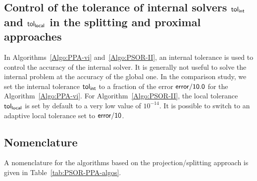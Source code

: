 \subsection{Control of the tolerance of internal solvers $\sf tol_{{int}}$ and $\sf tol_{{local}}$ in the splitting and proximal approaches}
\label{Sec:NSGS-LocalTol}
In Algorithms~\ref{Algo:PPA-vi} and~\ref{Algo:PSOR-II}, an internal tolerance is used to control the accuracy of the internal solver. It is generally not useful to solve the internal problem at the accuracy of the global one. In the comparison study, we set the internal tolerance $\sf tol_{{int}}$ to a fraction of the error $\sf error/10.0$ for the Algorithm~\ref{Algo:PPA-vi}. For Algorithm~\ref{Algo:PSOR-II}, the local tolerance  $\sf tol_{{local}}$ is  set by default to a very low value of $10^{-14}$. It is possible to switch to an adaptive local tolerance set to $\sf error/10$.

\subsection{Nomenclature}
A nomenclature for the algorithms based on the projection/splitting approach is given in Table~\ref{tab:PSOR-PPA-algos}.


